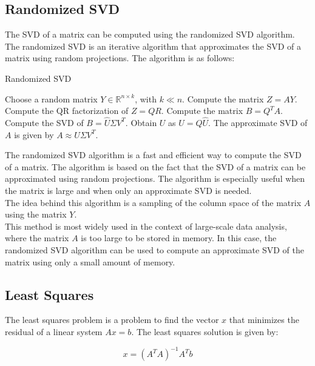 \subsection{Randomized SVD}

The SVD of a matrix can be computed using the randomized SVD algorithm. The randomized SVD is an iterative algorithm
that approximates the SVD of a matrix using random projections. The algorithm is as follows:

\begin{algorithm}[H]
    \caption{Randomized SVD}
    \begin{algorithmic}[1]
        \State Choose a random matrix $Y \in \mathbb{R}^{n \times k}$, with $k \ll n$.
        \State Compute the matrix $Z = A Y$.
        \State Compute the QR factorization of $Z = Q R$.
        \State Compute the matrix $B = Q^T A$.
        \State Compute the SVD of $B = \hat{U} \Sigma V^T$.
        \State Obtain $U$ as $U = Q \hat{U}$.
        \State The approximate SVD of $A$ is given by $A \approx U \Sigma V^T$.
    \end{algorithmic}
\end{algorithm}

The randomized SVD algorithm is a fast and efficient way to compute the SVD of a matrix. The algorithm is based on the
fact that the SVD of a matrix can be approximated using random projections. The algorithm is especially useful when
the matrix is large and when only an approximate SVD is needed.\\

The idea behind this algorithm is a sampling of the column space of the matrix $A$ using the matrix $Y$.\\

This method is most widely used in the context of large-scale data analysis, where the matrix $A$ is too large to be
stored in memory. In this case, the randomized SVD algorithm can be used to compute an approximate SVD of the matrix
using only a small amount of memory.

\subsection{Least Squares}

The least squares problem is a problem to find the vector $x$ that minimizes the residual of a linear system $A x = b$.
The least squares solution is given by:

\begin{equation}
    x = (A^T A)^{-1} A^T b
\end{equation}

